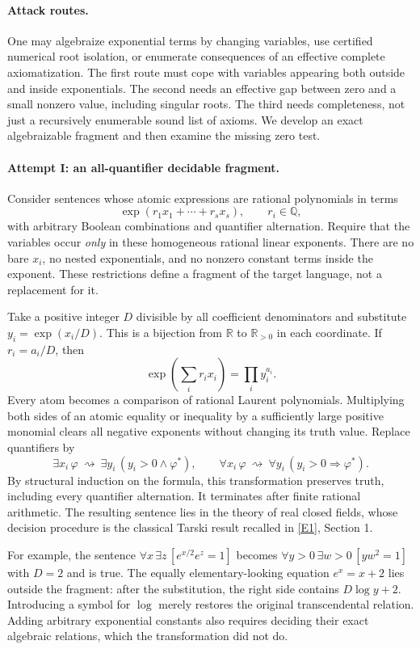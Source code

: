 \documentclass[11pt,a4paper]{article}
\newcommand{\Q}{\mathbb{Q}}
\newcommand{\R}{\mathbb{R}}
\newcommand{\eref}[2]{\hyperlink{extra:#1:#2}{[E#2]}}
\numberwithin{equation}{section}
\begin{document}
\paragraph{Attack routes.}
One may algebraize exponential terms by changing variables, use certified
numerical root isolation, or enumerate consequences of an effective
complete axiomatization.  The first route must cope with variables
appearing both outside and inside exponentials.  The second needs an
effective gap between zero and a small nonzero value, including singular
roots.  The third needs completeness, not just a recursively enumerable
sound list of axioms.  We develop an exact algebraizable fragment and
then examine the missing zero test.

\paragraph{Attempt I: an all-quantifier decidable fragment.}
Consider sentences whose atomic expressions are rational polynomials in
terms
\[
 \exp(r_1x_1+\cdots+r_sx_s),\qquad r_i\in\Q,
\]
with arbitrary Boolean combinations and quantifier alternation.  Require
that the variables occur \emph{only} in these homogeneous rational
linear exponents.  There are no bare $x_i$, no nested exponentials, and
no nonzero constant terms inside the exponent.  These restrictions
define a fragment of the target language, not a replacement for it.

Take a positive integer $D$ divisible by all coefficient denominators
and substitute $y_i=\exp(x_i/D)$.  This is a bijection from $\R$ to
$\R_{>0}$ in each coordinate.  If $r_i=a_i/D$, then
\[
 \exp\!\left(\sum_i r_i x_i\right)=\prod_i y_i^{a_i}.
\]
Every atom becomes a comparison of rational Laurent polynomials.
Multiplying both sides of an atomic equality or inequality by a
sufficiently large positive monomial clears all negative exponents
without changing its truth value.  Replace quantifiers by
\[
 \exists x_i\,\varphi\ \rightsquigarrow\
 \exists y_i\,(y_i>0\wedge\varphi^*),\qquad
 \forall x_i\,\varphi\ \rightsquigarrow\
 \forall y_i\,(y_i>0\Rightarrow\varphi^*).
\]
By structural induction on the formula, this transformation preserves
truth, including every quantifier alternation.  It terminates after
finite rational arithmetic.  The resulting sentence lies in the theory
of real closed fields, whose decision procedure is the classical
Tarski result recalled in \eref{1462}{1}, Section 1.

For example, the sentence
$\forall x\,\exists z\,[e^{x/2}e^z=1]$ becomes
$\forall y>0\,\exists w>0\,[yw^2=1]$ with $D=2$ and is true.
The equally elementary-looking equation $e^x=x+2$ lies outside the
fragment: after the substitution, the right side contains $D\log y+2$.
Introducing a symbol for $\log$ merely restores the original
transcendental relation.  Adding arbitrary exponential constants also
requires deciding their exact algebraic relations, which the
transformation did not do.
\end{document}
